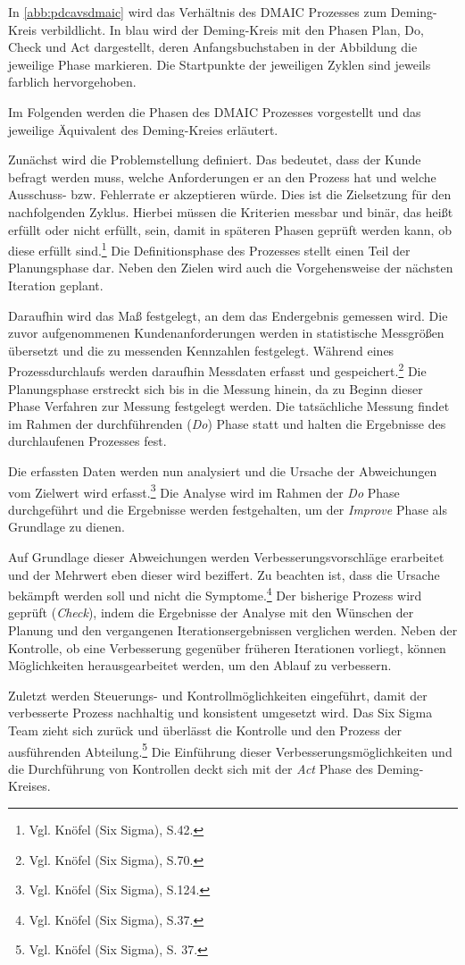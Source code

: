             In \autoref{abb:pdcavsdmaic} wird das Verhältnis des DMAIC Prozesses zum Deming-Kreis verbildlicht. In blau wird der Deming-Kreis mit den Phasen Plan, Do, Check und Act dargestellt, deren Anfangsbuchstaben in der Abbildung die jeweilige Phase markieren. Die Startpunkte der jeweiligen Zyklen sind jeweils farblich hervorgehoben.
            
            Im Folgenden werden die Phasen des DMAIC Prozesses vorgestellt und das jeweilige Äquivalent des Deming-Kreies erläutert.

            Zunächst wird die Problemstellung definiert. Das bedeutet, dass der Kunde befragt werden muss, welche Anforderungen er an den Prozess hat und welche Ausschuss- bzw. Fehlerrate er akzeptieren würde. Dies ist die Zielsetzung für den nachfolgenden Zyklus. Hierbei müssen die Kriterien messbar und binär, das heißt erfüllt oder nicht erfüllt, sein, damit in späteren Phasen geprüft werden kann, ob diese erfüllt sind.\footnote{Vgl. Knöfel (Six Sigma), S.42.} Die Definitionsphase des Prozesses stellt einen Teil der Planungsphase dar. Neben den Zielen wird auch die Vorgehensweise der nächsten Iteration geplant.

            Daraufhin wird das Maß festgelegt, an dem das Endergebnis gemessen wird. Die zuvor aufgenommenen Kundenanforderungen werden in statistische Messgrößen übersetzt und die zu messenden Kennzahlen festgelegt.
            Während eines Prozessdurchlaufs werden daraufhin Messdaten erfasst und gespeichert.\footnote{Vgl. Knöfel (Six Sigma), S.70.} Die Planungsphase erstreckt sich bis in die Messung hinein, da zu Beginn dieser Phase Verfahren zur Messung festgelegt werden. Die tatsächliche Messung findet im Rahmen der durchführenden (\emph{Do}) Phase statt und halten die Ergebnisse des durchlaufenen Prozesses fest.

            Die erfassten Daten werden nun analysiert und die Ursache der Abweichungen vom Zielwert wird erfasst.\footnote{Vgl. Knöfel (Six Sigma), S.124.} Die Analyse wird im Rahmen der \emph{Do} Phase durchgeführt und die Ergebnisse werden festgehalten, um der \emph{Improve} Phase als Grundlage zu dienen.

            Auf Grundlage dieser Abweichungen werden Verbesserungsvorschläge erarbeitet und der Mehrwert eben dieser wird beziffert. Zu beachten ist, dass die Ursache bekämpft werden soll und nicht die Symptome.\footnote{Vgl. Knöfel (Six Sigma), S.37.} Der bisherige Prozess wird geprüft (\emph{Check}), indem die Ergebnisse der Analyse mit den Wünschen der Planung und den vergangenen Iterationsergebnissen verglichen werden. Neben der Kontrolle, ob eine Verbesserung gegenüber früheren Iterationen vorliegt, können Möglichkeiten herausgearbeitet werden, um den Ablauf zu verbessern.

            Zuletzt werden Steuerungs- und Kontrollmöglichkeiten eingeführt, damit der verbesserte Prozess nachhaltig und konsistent umgesetzt wird. Das Six Sigma Team zieht sich zurück und überlässt die Kontrolle und den Prozess der ausführenden Abteilung.\footnote{Vgl. Knöfel (Six Sigma), S. 37.} Die Einführung dieser Verbesserungsmöglichkeiten und die Durchführung von Kontrollen deckt sich mit der \emph{Act} Phase des Deming-Kreises. 